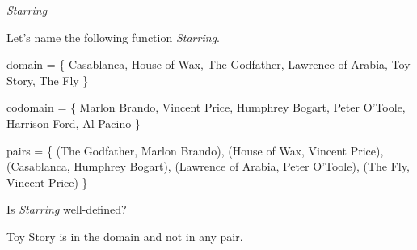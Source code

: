 \documentclass{ximera}
\begin{document}
\begin{example} \textit{Starring}

Let's name the following function \textit{Starring}.

domain = \{ Casablanca, House of Wax,  The Godfather, Lawrence of Arabia, Toy Story, The Fly \}

codomain = \{ Marlon Brando, Vincent Price, Humphrey Bogart, Peter O'Toole, Harrison Ford, Al Pacino \}

pairs = \{ (The Godfather, Marlon Brando), (House of Wax, Vincent Price), (Casablanca, Humphrey Bogart), (Lawrence of Arabia, Peter O'Toole), (The Fly, Vincent Price) \} 





\begin{question}

Is \textit{Starring} well-defined?

\begin{multipleChoice}
\end{multipleChoice}
\begin{feedback}
Toy Story is in the domain and not in any pair.
\end{feedback}

\end{question}



\end{example}
\end{document}
